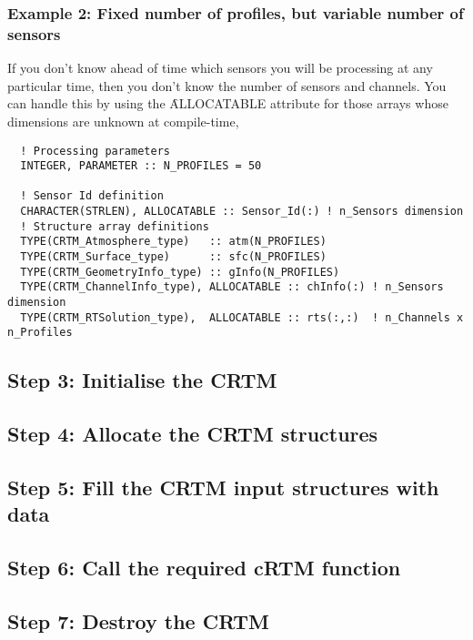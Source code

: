 \subsubsection{Example 2: Fixed number of profiles, but variable number of sensors}
If you don't know ahead of time which sensors you will be processing at any particular time, then you don't know the number of sensors and channels. You can handle this by using the \f{ALLOCATABLE} attribute for those arrays whose dimensions are unknown at compile-time,
\begin{ttfamily}
  \begin{verbatim}
  ! Processing parameters
  INTEGER, PARAMETER :: N_PROFILES = 50

  ! Sensor Id definition
  CHARACTER(STRLEN), ALLOCATABLE :: Sensor_Id(:) ! n_Sensors dimension
  ! Structure array definitions
  TYPE(CRTM_Atmosphere_type)   :: atm(N_PROFILES)
  TYPE(CRTM_Surface_type)      :: sfc(N_PROFILES)
  TYPE(CRTM_GeometryInfo_type) :: gInfo(N_PROFILES)  
  TYPE(CRTM_ChannelInfo_type), ALLOCATABLE :: chInfo(:) ! n_Sensors dimension
  TYPE(CRTM_RTSolution_type),  ALLOCATABLE :: rts(:,:)  ! n_Channels x n_Profiles\end{verbatim}
\end{ttfamily}




\subsection{Step 3: Initialise the CRTM}

\subsection{Step 4: Allocate the CRTM structures}

\subsection{Step 5: Fill the CRTM input structures with data}

\subsection{Step 6: Call the required cRTM function}

\subsection{Step 7: Destroy the CRTM}


